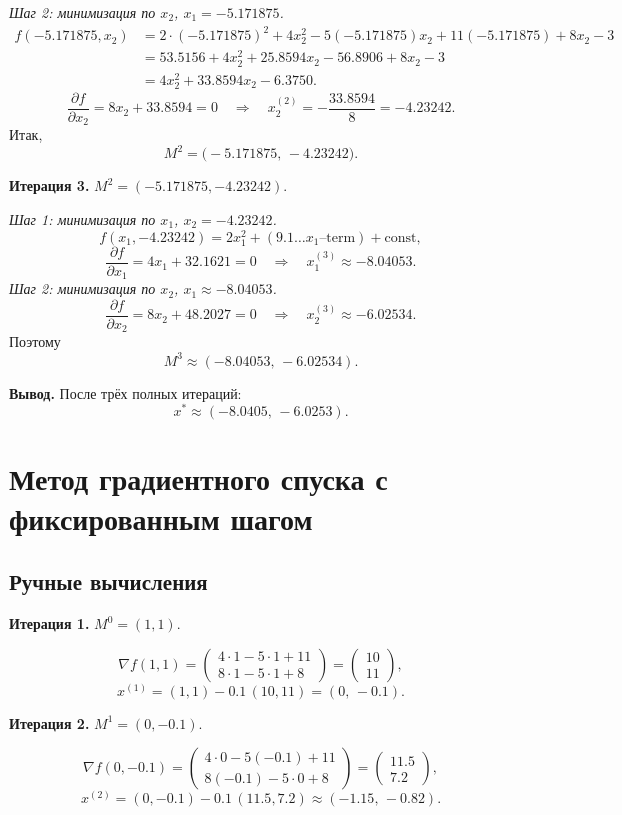\documentclass{article}
\begin{document}
\medskip
\emph{Шаг 2: минимизация по $x_2$, $x_1=-5.171875$.}
\begin{align*}
f(-5.171875,x_2)&=2\cdot(-5.171875)^2+4x_2^2-5(-5.171875)x_2+11(-5.171875)+8x_2-3\\
&=53.5156+4x_2^2+25.8594x_2-56.8906+8x_2-3\\
&=4x_2^2+33.8594x_2-6.3750.
\end{align*}
\[
\frac{\partial f}{\partial x_2}=8x_2+33.8594=0
\quad\Longrightarrow\quad
x_2^{(2)}=-\frac{33.8594}{8}=-4.23242.
\]
Итак,
\[
M^2=\bigl(-5.171875,\,-4.23242\bigr).
\]

\medskip
\textbf{Итерация 3.} $M^2=(-5.171875,-4.23242)$.

\medskip
\emph{Шаг 1: минимизация по $x_1$, $x_2=-4.23242$.}
\[
f(x_1,-4.23242)=2x_1^2+(9.1\ldots x_1\text{--term})+\text{const},
\]
\[
\frac{\partial f}{\partial x_1}=4x_1+32.1621=0
\quad\Longrightarrow\quad
x_1^{(3)}\approx-8.04053.
\]
\emph{Шаг 2: минимизация по $x_2$, $x_1\approx-8.04053$.}
\[
\frac{\partial f}{\partial x_2}=8x_2+48.2027=0
\quad\Longrightarrow\quad
x_2^{(3)}\approx-6.02534.
\]
Поэтому
\[
M^3\approx(-8.04053,\,-6.02534).
\]

\medskip
\textbf{Вывод.} После трёх полных итераций:
\[
x^*\approx(-8.0405,\,-6.0253).
\]

\section{Метод градиентного спуска с фиксированным шагом}
\subsection{Ручные вычисления}

\textbf{Итерация 1.} $M^0=(1,1)$.

\[
\nabla f(1,1)=
\begin{pmatrix}
4\cdot1-5\cdot1+11\\
8\cdot1-5\cdot1+8
\end{pmatrix}
=
\begin{pmatrix}
10\\
11
\end{pmatrix},
\]
\[
x^{(1)}=(1,1)-0.1\,(10,11)=(0,\,-0.1).
\]

\medskip
\textbf{Итерация 2.} $M^1=(0,-0.1)$.

\[
\nabla f(0,-0.1)=
\begin{pmatrix}
4\cdot0-5(-0.1)+11\\
8(-0.1)-5\cdot0+8
\end{pmatrix}
=
\begin{pmatrix}
11.5\\
7.2
\end{pmatrix},
\]
\[
x^{(2)}=(0,-0.1)-0.1\,(11.5,7.2)\approx(-1.15,\,-0.82).
\]
\end{document}
